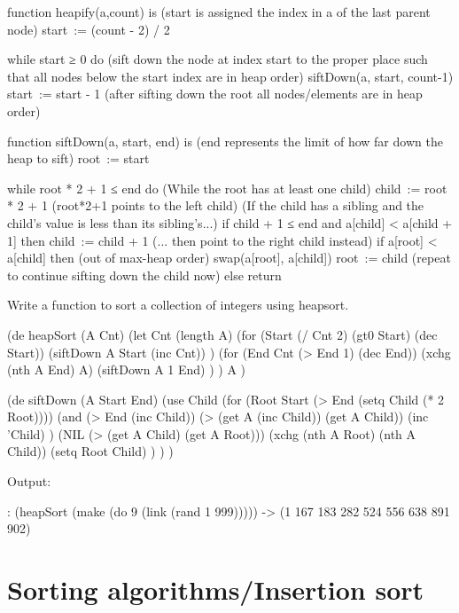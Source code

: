 \begin{wideverbatim}
function heapify(a,count) is
   (start is assigned the index in a of the last parent node)
   start := (count - 2) / 2
   
   while start ≥ 0 do
      (sift down the node at index start to the proper place
       such that all nodes below the start index are in heap
       order)
      siftDown(a, start, count-1)
      start := start - 1
   (after sifting down the root all nodes/elements are in heap order)
 
function siftDown(a, start, end) is
   (end represents the limit of how far down the heap to sift)
   root := start

   while root * 2 + 1 ≤ end do       (While the root has at least one child)
      child := root * 2 + 1           (root*2+1 points to the left child)
      (If the child has a sibling and the child's value is less than its sibling's...)
      if child + 1 ≤ end and a[child] < a[child + 1] then
         child := child + 1           (... then point to the right child instead)
      if a[root] < a[child] then     (out of max-heap order)
         swap(a[root], a[child])
         root := child                (repeat to continue sifting down the child now)
      else
         return
\end{wideverbatim}

Write a function to sort a collection of integers using heapsort.

\begin{wideverbatim}

(de heapSort (A Cnt)
   (let Cnt (length A)
      (for (Start (/ Cnt 2) (gt0 Start) (dec Start))
         (siftDown A Start (inc Cnt)) )
      (for (End Cnt (> End 1) (dec End))
         (xchg (nth A End) A)
         (siftDown A 1 End) ) )
   A )

(de siftDown (A Start End)
   (use Child
      (for (Root Start  (> End (setq Child (* 2 Root))))
         (and
            (> End (inc Child))
            (> (get A (inc Child)) (get A Child))
            (inc 'Child) )
         (NIL (> (get A Child) (get A Root)))
         (xchg (nth A Root) (nth A Child))
         (setq Root Child) ) ) )

Output:

: (heapSort (make (do 9 (link (rand 1 999)))))
-> (1 167 183 282 524 556 638 891 902)

\end{wideverbatim}

\pagebreak{}
\section*{Sorting algorithms/Insertion sort}

